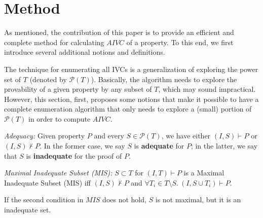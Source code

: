 \section{Method}
\label{sec:allivcs}
 
\newcommand{\ucalg}{IVC\_UC\xspace}  

\newcommand{\mink}{\textsc{MinimizeK}\xspace}
\newcommand{\reduceinv}{\textsc{ReduceInvariants}\xspace}
\newcommand{\minivc}{\textsc{MinimizeIvc}\xspace}

\newcommand{\checksat}{\textsc{CheckSat}\xspace}
\newcommand{\isadeq}{\textsc{CheckAdq}\xspace}
\newcommand{\actlit}{\textsc{ActLit}}
\newcommand{\unsatcore}{\textsc{UnsatCore}\xspace}
\newcommand{\unsat}{\texttt{UNSAT}\xspace}
\newcommand{\sat}{\texttt{SAT}\xspace}

As mentioned, the contribution of this paper is to provide an efficient and complete method for calculating $AIVC$ of a property. To this end, we first introduce several additional notions and definitions. 

The technique for enumerating all IVCs is a generalization of exploring the power set of $T$ (denoted by $ \mathcal{P}(T) $).
Basically, the algorithm needs to explore the provability of a
given property by any subset of $T$, which may sound impractical.
However, this section, first, proposes some notions that make it possible to have a complete
enumeration algorithm that only needs to explore a (small) portion of $\mathcal{P}(T)$
in order to compute $AIVC$.

\begin{definition} {\emph{Adequacy:}}
\label{def:adeq}
Given property $P$ and every $S \in \mathcal{P}(T)$, we have either $(I, S) \vdash P$ or $(I, S) \nvdash P$. In the former case, we say $S$ is \textbf{adequate} for $P$; in the latter, we say that $S$ is \textbf{inadequate} for the proof of $P$.
\end{definition}

\begin{definition}{\emph{Maximal Inadequate Subset (MIS):}}
  \label{def:mis}
  $S \subset T$ for $(I, T) \vdash P$ is a Maximal Inadequate Subset (MIS) iff
  $(I, S) \nvdash P$ and $\forall T_i \in T\setminus S.~ (I, S\cup{T_i}) \vdash P$.
\end{definition}
\begin{note}
If the second condition in $MIS$ does not hold, $S$ is not maximal, but it is an inadequate set.
\end{note}

